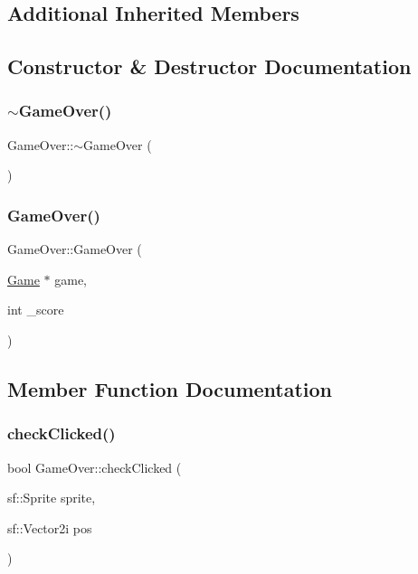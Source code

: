 \subsection*{Additional Inherited Members}


\subsection{Constructor \& Destructor Documentation}
\mbox{\label{class_game_over_ae36951a153d25d52fab7cbc7a85bbbbd}} 
\subsubsection{\texorpdfstring{$\sim$\+Game\+Over()}{~GameOver()}}
{\footnotesize\ttfamily Game\+Over\+::$\sim$\+Game\+Over (\begin{DoxyParamCaption}{ }\end{DoxyParamCaption})}

\mbox{\label{class_game_over_aa3f05675e69ff44ac0f4edab4f3c2f14}} 
\subsubsection{\texorpdfstring{Game\+Over()}{GameOver()}}
{\footnotesize\ttfamily Game\+Over\+::\+Game\+Over (\begin{DoxyParamCaption}\item[{\hyperlink{class_game}{Game} $\ast$}]{game,  }\item[{int}]{\+\_\+score }\end{DoxyParamCaption})}



\subsection{Member Function Documentation}
\mbox{\label{class_game_over_a7239e22d93ea5a1374b5b75af3ed7ed6}} 
\subsubsection{\texorpdfstring{check\+Clicked()}{checkClicked()}}
{\footnotesize\ttfamily bool Game\+Over\+::check\+Clicked (\begin{DoxyParamCaption}\item[{sf\+::\+Sprite}]{sprite,  }\item[{sf\+::\+Vector2i}]{pos }\end{DoxyParamCaption})}

